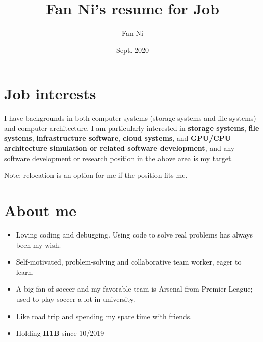 \documentclass{article}
\title{Fan Ni's resume for Job}
\author{Fan Ni}
\date{Sept. 2020}
\begin{document}

\makecvtitle %

\section{Job interests}
I have backgrounds in both computer systems (storage systems and file systems) and computer architecture. I am particularly interested in \textbf{storage systems}, \textbf{file systems}, \textbf{infrastructure software}, \textbf{cloud systems}, and \textbf{GPU/CPU architecture simulation or related software development}, and any software development or research position in the above area is my target.

Note: relocation is an option for me if the position fits me.

\section{About me}
\begin{itemize}
    \item Loving coding and debugging. Using code to solve real problems has always been my wish. 
    \item Self-motivated, problem-solving and collaborative team worker, eager to learn.
    \item A big fan of soccer and my favorable team is Arsenal from Premier League; used to play soccer a lot in university. 
    \item Like road trip and spending my spare time with friends.
    \item Holding \textbf{H1B} since 10/2019
\end{itemize}
\end{document}
